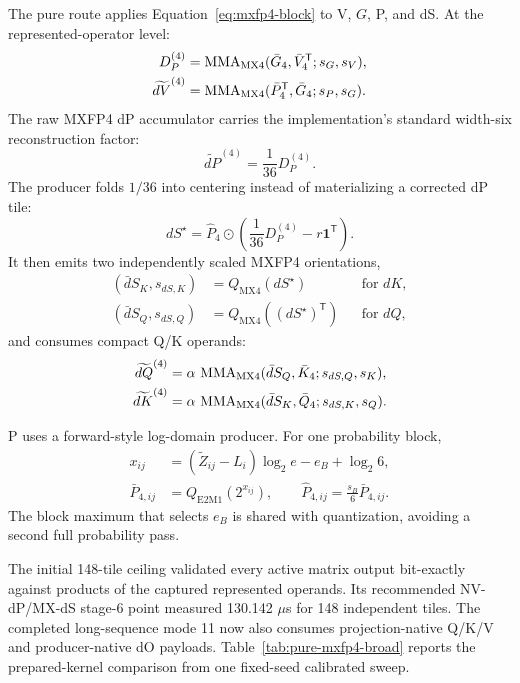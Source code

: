 The pure route applies Equation~\ref{eq:mxfp4-block} to V, $G$, P, and dS.
At the represented-operator level:
\begin{align}
  D_P^{(4)}
    &=\operatorname{MMA}_{\mathrm{MX4}}(\bar G_4,\bar V_4^\mathsf T;
       s_G,s_V),\\
  \widetilde{dV}^{(4)}
    &=\operatorname{MMA}_{\mathrm{MX4}}(\bar P_4^\mathsf T,\bar G_4;
       s_P,s_G).
  \label{eq:pure-dp-dv}
\end{align}
The raw MXFP4 dP accumulator carries the implementation's standard
width-six reconstruction factor:
\begin{equation}
  \widetilde{dP}^{(4)}=\frac{1}{36}D_P^{(4)}.
  \label{eq:mxfp4-dp-correction}
\end{equation}
The producer folds $1/36$ into centering instead of materializing a corrected
dP tile:
\begin{equation}
  dS^\star
  =\widehat P_4\odot
   \left(\frac{1}{36}D_P^{(4)}-r\mathbf1^\mathsf T\right).
  \label{eq:pure-ds-prequant}
\end{equation}
It then emits two independently scaled MXFP4 orientations,
\begin{align}
  (\bar dS_K,s_{dS,K})&=Q_{\mathrm{MX4}}(dS^\star)
    &&\text{for }dK,\\
  (\bar dS_Q,s_{dS,Q})&=Q_{\mathrm{MX4}}((dS^\star)^\mathsf T)
    &&\text{for }dQ,
  \label{eq:pure-dual-ds}
\end{align}
and consumes compact Q/K operands:
\begin{align}
  \widetilde{dQ}^{(4)}
  &=\alpha\,
    \operatorname{MMA}_{\mathrm{MX4}}(\bar dS_Q,\bar K_4;
      s_{dS,Q},s_K),\\
  \widetilde{dK}^{(4)}
  &=\alpha\,
    \operatorname{MMA}_{\mathrm{MX4}}(\bar dS_K,\bar Q_4;
      s_{dS,K},s_Q).
  \label{eq:pure-dq-dk}
\end{align}

P uses a forward-style log-domain producer.  For one probability block,
\begin{align}
  x_{ij} &=
    (\widetilde Z_{ij}-L_i)\log_2e-e_B+\log_2 6,\\
  \bar P_{4,ij} &=Q_{\mathrm{E2M1}}(2^{x_{ij}}),\qquad
  \widehat P_{4,ij}=\frac{s_B}{6}\bar P_{4,ij}.
  \label{eq:pure-log-p}
\end{align}
The block maximum that selects $e_B$ is shared with quantization, avoiding a
second full probability pass.

The initial 148-tile ceiling validated every active matrix output bit-exactly
against products of the captured represented operands.  Its recommended
NV-dP/MX-dS stage-6 point measured 130.142 $\mu$s for 148 independent tiles.
The completed long-sequence mode 11 now also consumes projection-native Q/K/V
and producer-native dO payloads.  Table~\ref{tab:pure-mxfp4-broad} reports the
prepared-kernel comparison from one fixed-seed calibrated sweep.

